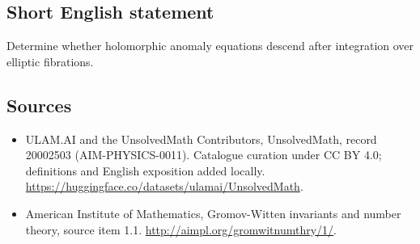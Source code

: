 \documentclass[11pt]{article}
\begin{document}
\subsection{Short English statement}
Determine whether holomorphic anomaly equations descend after integration over elliptic fibrations.
\subsection{Sources}
\begin{itemize}
\item[\hypertarget{source:20002503:1}{S1}] ULAM.AI and the UnsolvedMath Contributors, UnsolvedMath, record 20002503 (AIM-PHYSICS-0011). Catalogue curation under CC BY 4.0; definitions and English exposition added locally.
\url{https://huggingface.co/datasets/ulamai/UnsolvedMath}.
\item[\hypertarget{source:20002503:2}{S2}] American Institute of Mathematics, Gromov-Witten invariants and number theory, source item 1.1.
\url{http://aimpl.org/gromwitnumthry/1/}.
\end{itemize}
\label{end:20002503}
\end{document}
